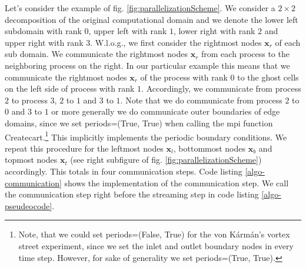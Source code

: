 \documentclass[a4paper,11pt, footsepline]{book}
\begin{document}
Let's consider the example of fig. \ref{fig:parallelizationScheme}. We consider a $2\times 2$ decomposition of the original computational domain and we denote the lower left subdomain with rank $0$, upper left with rank $1$, lower right with rank $2$ and upper right with rank $3$. W.l.o.g., we first consider the rightmost nodes $\mathbf{x}_r$ of each sub domain. We communicate the rightmost nodes $\mathbf{x}_r$ from each process to the neighboring process on the right. In our particular example this means that we communicate the rightmost nodes $\mathbf{x}_r$ of the process with rank $0$ to the ghost cells on the left side of process with rank $1$. Accordingly, we communicate from process $2$ to process $3$, $2$ to $1$ and $3$ to $1$. Note that we do communicate from process $2$ to $0$ and $3$ to $1$ or more generally we do communicate outer boundaries of edge domains, since we set \textsf{periods=(True, True)} when calling the \ac{mpi} function \textsf{Create\textunderscore cart}.\footnote{Note, that we could set \textsf{periods=(False, True)} for the von K\'{a}rm\'{a}n's vortex street experiment, since we set the inlet and outlet boundary nodes in every time step. However, for sake of generality we set \textsf{periods=(True, True)}.} This implicitly implements the periodic boundary conditions.
We repeat this procedure for the leftmost nodes $\mathbf{x}_l$, bottommost nodes $\mathbf{x}_b$ and topmost nodes $\mathbf{x}_t$ (see right subfigure of fig. \ref{fig:parallelizationScheme}) accordingly. This totals in four communication steps. Code listing \ref{algo-communication} shows the implementation of the communication step. We call the communication step right before the streaming step in code listing \ref{algo-pseudeocode}.
\end{document}
